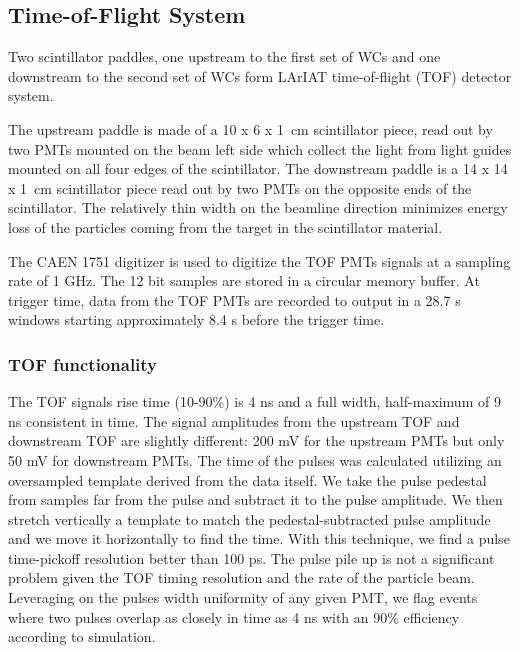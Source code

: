 \subsection{Time-of-Flight System}\label{sec:TOF}
Two scintillator paddles, one upstream to the first set of WCs and one downstream to the second set of WCs  form LArIAT  time-of-flight (TOF) detector system. 

The upstream paddle is made of a 10 x 6 x 1~cm scintillator piece, read out by two PMTs mounted on the beam left side which collect the light from light guides mounted on all four edges of the scintillator. The downstream paddle is a   14 x 14 x 1~cm scintillator piece read out by two PMTs on the opposite ends of the scintillator.
The relatively thin width on the beamline direction minimizes energy loss of the particles coming from the target in the scintillator material.

The CAEN 1751 digitizer is used to digitize the TOF PMTs signals at a sampling rate of 1 GHz. The 12 bit samples are stored in a circular memory buffer. At trigger time, data from the TOF PMTs are recorded to output in a 28.7 \textmu s windows starting  approximately 8.4 \textmu s before the trigger time. 



\subsubsection{TOF functionality}\label{sec:MWPCfunc}


The TOF signals rise time (10-90\%) is 4 ns and a full width, half-maximum of 9 ns consistent in time. The signal amplitudes from the upstream TOF and  downstream TOF are slightly different:  200 mV for the upstream PMTs but only 50 mV for downstream PMTs. The time of the pulses was calculated utilizing an oversampled template derived from the data itself. We take the pulse pedestal from samples far from the pulse and subtract it to the pulse amplitude. We then stretch vertically a template to match the pedestal-subtracted pulse amplitude and we move it horizontally to find the time. With this technique, we find a pulse time-pickoff resolution better than 100 ps.  The pulse pile up is not a significant problem given the TOF timing resolution and the rate of the particle beam.  Leveraging on the pulses width uniformity of any given PMT,  we flag events where two pulses overlap as closely in time as 4 ns with an 90\% efficiency according to simulation. 


